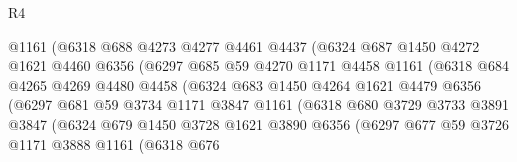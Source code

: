 \begin{lexlean}{R4}
\begin{coremodule}
                          @1161
                          (@6318
                            @688
                            @4273
                            @4277
                            @4461
                            @4437
                            (@6324
                              @687
                              @1450
                              @4272
                              @1621
                              @4460
                              @6356
                              (@6297
                                @685
                                @59
                                @4270
                                @1171
                                @4458
                                @1161
                                (@6318
                                  @684
                                  @4265
                                  @4269
                                  @4480
                                  @4458
                                  (@6324
                                    @683
                                    @1450
                                    @4264
                                    @1621
                                    @4479
                                    @6356
                                    (@6297
                                      @681
                                      @59
                                      @3734
                                      @1171
                                      @3847
                                      @1161
                                      (@6318
                                        @680
                                        @3729
                                        @3733
                                        @3891
                                        @3847
                                        (@6324
                                          @679
                                          @1450
                                          @3728
                                          @1621
                                          @3890
                                          @6356
                                          (@6297
                                            @677
                                            @59
                                            @3726
                                            @1171
                                            @3888
                                            @1161
                                            (@6318
                                              @676

\end{coremodule}
\end{lexlean}
